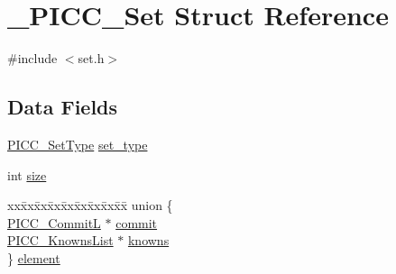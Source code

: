 \hypertarget{struct__PICC__Set}{\section{\-\_\-\-P\-I\-C\-C\-\_\-\-Set Struct Reference}
\label{struct__PICC__Set}
}


{\ttfamily \#include $<$set.\-h$>$}

\subsection*{Data Fields}
\begin{DoxyCompactItemize}
\item 
\hyperlink{set_8h_a4b6452c366a4ad94e2d44482416e70ce}{P\-I\-C\-C\-\_\-\-Set\-Type} \hyperlink{struct__PICC__Set_ae5656c6be8745315fe61a6e4be532bec}{set\-\_\-type}
\item 
int \hyperlink{struct__PICC__Set_ae294350a9386f6e656de3b851a18b651}{size}
\item 
\begin{tabbing}
xx\=xx\=xx\=xx\=xx\=xx\=xx\=xx\=xx\=\kill
union \{\\
\>\hyperlink{set_8h_a4e156f04e6c171d7c62eef3f6aa0e9e1}{PICC\_CommitL} $\ast$ \hyperlink{struct__PICC__Set_a64527043126276defd03f9a32445f0e1}{commit}\\
\>\hyperlink{set_8h_a3af1ac6fc4255970b8d67d50fe443680}{PICC\_KnownsList} $\ast$ \hyperlink{struct__PICC__Set_a4080232ebc5e47b3a1e8b924eb58eaeb}{knowns}\\
\} \hyperlink{struct__PICC__Set_a16102b7212f244b0043331180144f6b0}{element}\\

\end{tabbing}\end{DoxyCompactItemize}


